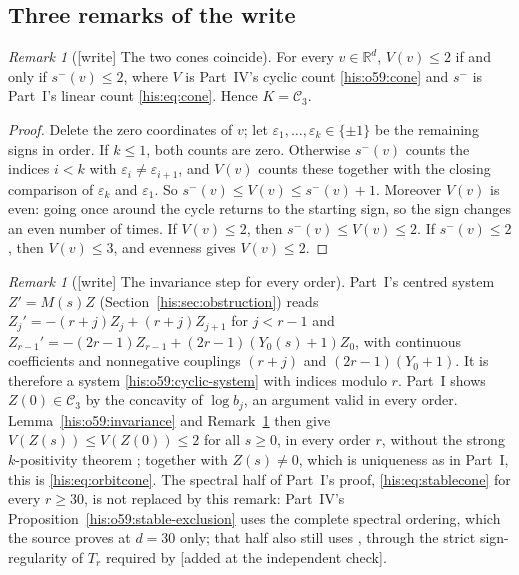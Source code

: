 \documentclass[11pt]{article}
\theoremstyle{remark}\newtheorem{remark}[theorem]{Remark}
\newcommand{\eps}{\varepsilon}
\newcommand{\R}{\mathbb R}
\numberwithin{equation}{section}
\begin{document}
\subsection{Three remarks of the write}\label{his:o59:sec:remarks}
\begin{remark}[\textsf{[write]} The two cones coincide]\label{his:o59:rem:same-cone}
For every $v\in\R^d$, $V(v)\le2$ if and only if $s^-(v)\le2$, where $V$ is Part~IV's cyclic count \eqref{his:o59:cone} and $s^-$ is Part~I's linear count \eqref{his:eq:cone}. Hence $K=\mathcal C_3$.
\end{remark}
\begin{proof}
Delete the zero coordinates of $v$; let $\eps_1,\ldots,\eps_k\in\{\pm1\}$ be the remaining signs in order. If $k\le1$, both counts are zero. Otherwise $s^-(v)$ counts the indices $i<k$ with $\eps_i\ne\eps_{i+1}$, and $V(v)$ counts these together with the closing comparison of $\eps_k$ and $\eps_1$. So $s^-(v)\le V(v)\le s^-(v)+1$. Moreover $V(v)$ is even: going once around the cycle returns to the starting sign, so the sign changes an even number of times. If $V(v)\le2$, then $s^-(v)\le V(v)\le2$. If $s^-(v)\le2$, then $V(v)\le3$, and evenness gives $V(v)\le2$.
\end{proof}
\begin{remark}[\textsf{[write]} The invariance step for every order]\label{his:o59:rem:every-r}
Part~I's centred system $Z'=M(s)Z$ (Section~\ref{his:sec:obstruction}) reads $Z_j'=-(r+j)Z_j+(r+j)Z_{j+1}$ for $j<r-1$ and $Z_{r-1}'=-(2r-1)Z_{r-1}+(2r-1)(Y_0(s)+1)Z_0$, with continuous coefficients and nonnegative couplings $(r+j)$ and $(2r-1)(Y_0+1)$. It is therefore a system \eqref{his:o59:cyclic-system} with indices modulo $r$. Part~I shows $Z(0)\in\mathcal C_3$ by the concavity of $\log b_j$, an argument valid in every order. Lemma~\ref{his:o59:invariance} and Remark~\ref{his:o59:rem:same-cone} then give $V(Z(s))\le V(Z(0))\le2$ for all $s\ge0$, in every order $r$, without the strong $k$-positivity theorem \cite{weiss2021}; together with $Z(s)\ne0$, which is uniqueness as in Part~I, this is \eqref{his:eq:orbitcone}. The spectral half of Part~I's proof, \eqref{his:eq:stablecone} for every $r\ge30$, is not replaced by this remark: Part~IV's Proposition~\ref{his:o59:stable-exclusion} uses the complete spectral ordering, which the source proves at $d=30$ only; that half also still uses \cite{weiss2021}, through the strict sign-regularity of $T_r$ required by \cite{alseidi2019} \textup{[}added at the independent check\textup{]}.
\end{remark}
\end{document}

